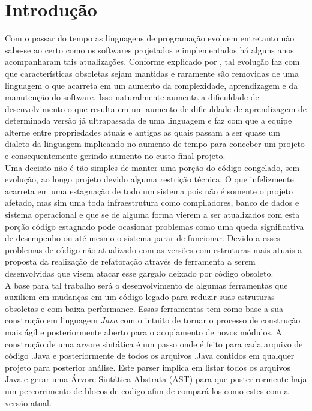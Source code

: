 \chapter{Introdução}
Com o passar do tempo as linguagens de programação evoluem entretanto não sabe-se ao certo como os softwares projetados e implementados há alguns anos acompanharam tais atualizações. Conforme explicado por \cite{Jeffrey_Ralph}, tal evolução faz com que características obsoletas sejam mantidas e raramente são removidas de uma linguagem o que acarreta em um aumento da complexidade, aprendizagem e da manutenção do software. Isso naturalmente aumenta a dificuldade de desenvolvimento o que resulta em um aumento de dificuldade de aprendizagem de determinada versão já ultrapassada de uma linguagem e faz com que a equipe alterne entre propriedades atuais e antigas as quais passam a ser quase um dialeto da linguagem implicando no aumento de tempo para conceber um projeto e consequentemente gerindo aumento no custo final projeto.\\

Uma decisão não é tão simples de manter uma porção do código congelado, sem evolução, ao longo projeto devido alguma restrição técnica. O que infelizmente acarreta em uma estagnação de todo um sistema pois não é somente o projeto afetado, mas sim uma toda infraestrutura como compiladores, banco de dados e sistema operacional e que se de alguma forma vierem a ser atualizados com esta porção código estagnado pode ocasionar problemas como uma queda significativa de desempenho ou até mesmo o sistema parar de funcionar. Devido a esses problemas de código não atualizado com as versões com estruturas mais atuais a proposta da realização de refatoração através de ferramenta a serem desenvolvidas que visem atacar esse gargalo deixado por código obsoleto.\\

A base para tal trabalho será o desenvolvimento de algumas ferramentas que auxiliem em mudanças em um código legado para reduzir suas estruturas obsoletas e com baixa performance. Essas ferramentas tem como base a sua construção em linguagem {\it Java} com o intuito de tornar o processo de construção mais ágil e posteriormente aberto para o acoplamento de novos módulos. A construção de uma arvore sintática é um passo onde é feito para cada arquivo de código .Java e posteriormente de todos os arquivos .Java contidos em qualquer projeto para posterior análise. Este parser implica em listar todos os arquivos Java e gerar uma Árvore Sintática Abstrata (AST) para que posterirormente haja um percorrimento de blocos de codigo afim de compará-los como estes com a versão atual.\\

